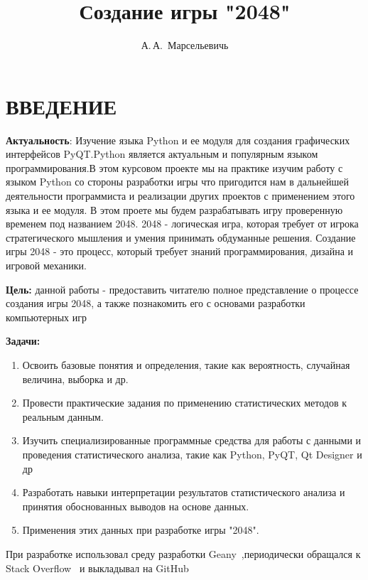 \documentclass[14pt, oneside]{altsu-report}
\title{Создание игры "2048"}
\author{А.\,А.~Марсельевичь}
\institute{Институт цифровых технологий, электроники и физики}
\date{\the\year}
\begin{document}
\maketitle

\setcounter{page}{2}
\makeabstract
\tableofcontents

\chapter*{ВВЕДЕНИЕ}

\textbf{Актуальность}:
Изучение языка Python и ее модуля для создания графических  интерфейсов PyQT.Python является актуальным и популярным языком программирования.В этом курсовом проекте мы на практике изучим работу с языком Python со стороны разработки игры что пригодится нам в дальнейшей деятельности программиста и реализации других проектов с применением этого языка и ее модуля.
В этом проете мы будем разрабатывать игру проверенную временем под названием 2048. 2048 - логическая игра, которая требует от игрока стратегического мышления и умения принимать обдуманные решения. Создание игры 2048 - это процесс, который требует знаний программирования, дизайна и игровой механики.

\textbf{Цель:} данной работы - предоставить читателю полное представление о процессе создания игры 2048, а также познакомить его с основами разработки компьютерных игр

\textbf{Задачи:}
\begin{enumerate}
\item  Освоить базовые понятия и определения, такие как вероятность, случайная величина, выборка  и др.
\item Провести практические задания по применению статистических методов к реальным данным.
\item Изучить специализированные программные средства для работы с данными и проведения статистического анализа, такие как  Python, PyQT, Qt Designer и др
\item Разработать навыки интерпретации результатов статистического анализа и принятия обоснованных выводов на основе данных.
\item Применения этих данных при разработке игры "2048".
\end{enumerate}
При разработке использовал среду разработки Geany~\cite{Geany},периодически обращался к Stack Overflow~\cite{Stack} и выкладывал на GitHub~\cite{wikiRUGitHub}



\end{document}
